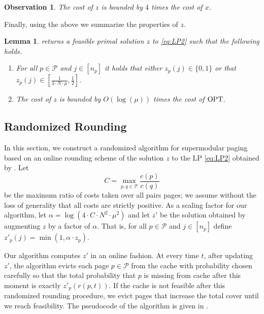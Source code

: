 \documentclass[11pt]{article}
\newcommand{\comment}[1]{}
\newcommand{\cP}{{\mathcal{P}}}
\newcommand{\OPT}{\textnormal{OPT}}
\newtheorem{obs}[thm]{Observation}
\newtheorem{lemma}[thm]{Lemma}
\begin{document}
\begin{obs}
	\label{obs:z}
	The cost of $z$ is bounded by $4$ times the cost of $x$. 
\end{obs}

Finally, using the above we summarize the properties of $z$.

	\begin{lemma}
	\label{lem:ALGf}
	 returns a feasible primal solution $z$ to \eqref{eq:LP2} such that the following holds. 
	\begin{enumerate}
		\item For all $p \in \cP$ and $j \in [n_p]$ it holds that either $z_p(j) \in \{0,1\}$ or that $z_p(j) \in \left[\frac{1}{4 \cdot N \cdot \mu},\frac{1}{2}\right]$.
		\item The cost of $z$ is bounded by $O(\log (\mu))$ times the cost of $\OPT$. 
	\end{enumerate}
\end{lemma}

\comment{
\begin{proof}
	The feasibility of $z$ follows from \Cref{lem:zFeasible}. Moreover, the first property follows from \Cref{step:1/2,step:z} of the algorithm. For the second property, since $x$ and $y$ are feasible primal and dual solutions by \Cref{lem:primalX} and \Cref{lem:FFeasible}, it follows that the cost of $x$ is bounded by $O(\log (\mu))$ times the cost of $\OPT$. Thus, the proof follows from Observation~\ref{obs:z}.  
\end{proof}
}

\subsection{Randomized Rounding}

In this section, we construct a randomized algorithm for supermodular paging based on an online rounding scheme of the solution $z$ to the LP \eqref{eq:LP2} obtained by . Let $$C = \max_{p,q \in \cP} \frac{c(p)}{c(q)}$$ be the maximum ratio of costs taken over all pairs pages; we assume without the loss of generality that all costs are strictly positive. As a scaling factor for our algorithm, let $\alpha = \log \left(4 \cdot C \cdot N^2 \cdot \mu^2\right)$ and let $z'$ be the solution obtained by augmenting $z$ by a factor of $\alpha$. That is, for all $p \in \cP$ and $j \in [n_p]$ define $z'_p(j) = \min \left( 1, \alpha \cdot z_p \right)$.  

Our algorithm computes $z'$ in an online fashion. At every time $t$, after updating $z'$, the algorithm evicts each page $p \in \cP$ from the cache with probability chosen carefully so that the total probability that $p$ is missing from cache after this moment is exactly $z'_p(r(p,t))$. %
If the cache is not feasible after this randomized rounding procedure, we evict pages that increase the total cover until we reach feasibility. The pseudocode of the algorithm is given in . 
\end{document}
